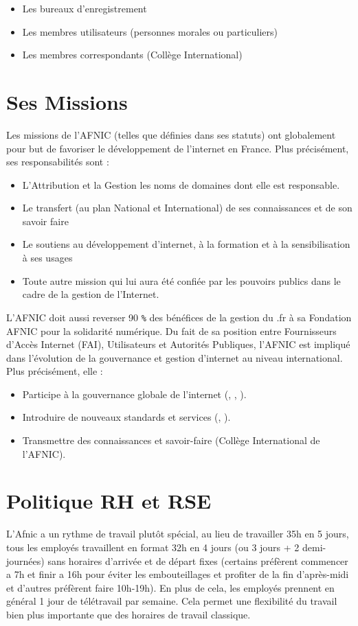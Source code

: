 \begin{itemize}
    \item Les bureaux d’enregistrement
    \item Les membres utilisateurs (personnes morales ou particuliers)
    \item Les membres correspondants (Collège International) 
\end{itemize}

\section{Ses Missions}
Les missions de l’AFNIC (telles que définies dans ses statuts) ont globalement pour but de favoriser le développement de l’internet en France.
Plus précisément, ses responsabilités sont :
\begin{itemize}
    \item L’Attribution et la Gestion les noms de domaines dont elle est responsable.
    \item Le transfert (au plan National et International) de ses connaissances et de son savoir faire
    \item Le soutiens au développement d’internet, à la formation et à la sensibilisation à ses usages
    \item Toute autre mission qui lui aura été confiée par les pouvoirs publics dans le cadre de la gestion de l’Internet.
\end{itemize}
L’AFNIC doit aussi reverser 90 \verb|%| des bénéfices de la gestion du .fr à sa Fondation AFNIC pour la solidarité numérique.
Du fait de sa position entre Fournisseurs d’Accès Internet (FAI), Utilisateurs et Autorités Publiques, l’AFNIC est impliqué dans l’évolution de la gouvernance et gestion d’internet au niveau international. Plus précisément, elle :
\begin{itemize}
    \item Participe à la gouvernance globale de l'internet (, , ).
    \item Introduire de nouveaux standards et services (, ).
    \item Transmettre des connaissances et savoir-faire (Collège International de l’AFNIC).
\end{itemize}


\section{Politique RH et RSE}
L'Afnic a un rythme de travail plutôt spécial, au lieu de travailler 35h en 5 jours, tous les employés travaillent en format 32h en 4 jours (ou 3 jours + 2 demi-journées) sans horaires d'arrivée et de départ fixes (certains préfèrent commencer a 7h et finir a 16h pour éviter les embouteillages et profiter de la fin d'après-midi et d'autres préfèrent faire 10h-19h).
En plus de cela, les employés prennent en général 1 jour de télétravail par semaine.
Cela permet une flexibilité du travail bien plus importante que des horaires de travail classique.





